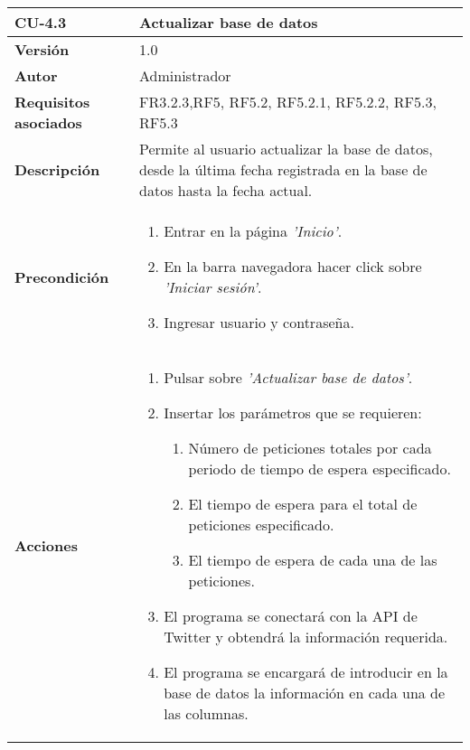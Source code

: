 \begin{table}[h!]
	\centering
	\begin{tabularx}{\linewidth}{ p{} p{} }
		\toprule
		\textbf{CU-4.3}    & \textbf{Actualizar base de datos}\\
		\toprule
		\textbf{Versión}              & 1.0    \\
		\textbf{Autor}                & Administrador \\
		\textbf{Requisitos asociados} & FR3.2.3,RF5, RF5.2, RF5.2.1, RF5.2.2, RF5.3, RF5.3\\
		\textbf{Descripción}          & Permite al usuario actualizar la base de datos, desde la última fecha registrada en la base de datos hasta la fecha actual.\\
        \textbf{Precondición}         &  
  	\begin{enumerate}
			\def\labelenumi{\arabic{enumi}.}
			\tightlist
			\item Entrar en la página \textit{'Inicio'}.
			\item En la barra navegadora hacer click sobre \textit{'Iniciar sesión'}.
            \item Ingresar usuario y contraseña.
		\end{enumerate}\\
		\textbf{Acciones}             &
		\begin{enumerate}
			\def\labelenumi{\arabic{enumi}.}
			\tightlist
			\item Pulsar sobre \textit{'Actualizar base de datos'}.
            \item Insertar los parámetros que se requieren:
            \begin{enumerate}
    			\def\labelenumi{\arabic{enumi}.}
    			\tightlist
    			\item Número de peticiones totales por cada periodo de tiempo de espera especificado.
                \item El tiempo de espera para el total de peticiones especificado.
                \item El tiempo de espera de cada una de las peticiones.
		  \end{enumerate}
            \item El programa se conectará con la API de Twitter y obtendrá la información requerida.
            \item El programa se encargará de introducir en la base de datos la información en cada una de las columnas.

\end{enumerate}
\end{tabularx}
\end{table}
